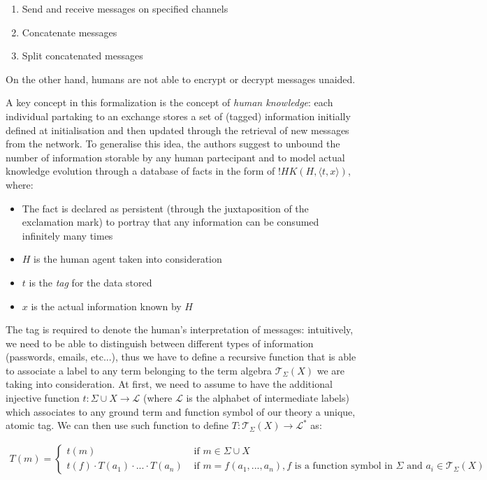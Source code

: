 \documentclass{article}
\begin{document}
\begin{enumerate}
    \item Send and receive messages on specified channels
    \item Concatenate messages
    \item Split concatenated messages
\end{enumerate}

On the other hand, humans are not able to encrypt or decrypt messages unaided.

A key concept in this formalization is the concept of \textit{human knowledge}: each individual partaking to an exchange stores a set of (tagged) information initially defined at initialisation and then updated through the retrieval of new messages from the network. To generalise this idea, the authors suggest to unbound the number of information storable by any human partecipant and to model actual knowledge evolution through a database of facts in the form of $!HK(H, \langle t, x \rangle)$, where:

\begin{itemize}
    \item The fact is declared as persistent (through the juxtaposition of the exclamation mark) to portray that any information can be consumed infinitely many times
    \item $H$ is the human agent taken into consideration
    \item $t$ is the \textit{tag} for the data stored
    \item $x$ is the actual information known by $H$
\end{itemize}

The tag is required to denote the human's interpretation of messages: intuitively, we need to be able to distinguish between different types of information (passwords, emails, etc...), thus we have to define a recursive function that is able to associate a label to any term belonging to the term algebra $\mathcal{T}_{\Sigma}(X)$ we are taking into consideration. At first, we need to assume to have the additional injective function $t: \Sigma \cup X \to \mathcal{L}$ (where $\mathcal{L}$ is the alphabet of intermediate labels) which associates to any ground term and function symbol of our theory a unique, atomic tag. We can then use such function to define $T:\mathcal{T}_{\Sigma}(X) \to \mathcal{L^*}$ as:

\begin{align*}
    T(m) =
    \begin{cases}
        t(m) & \textrm{ if } m \in \Sigma \cup X \\
        t(f) \cdot T(a_1) \cdot ... \cdot T(a_n) & \textrm{ if } m = f(a_1, ..., a_n), f \textrm{ is a function symbol in } \Sigma \textrm{ and } a_i \in \mathcal{T}_{\Sigma}(X)
    \end{cases}
\end{align*}
\end{document}
